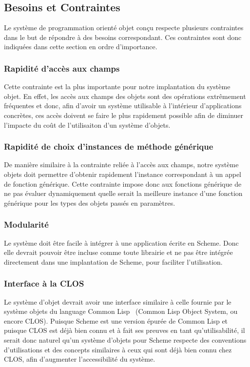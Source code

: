 \documentclass[letterpaper,12pt]{article}
\begin{document}
\clearpage



  \subsection{Besoins et Contraintes}
    Le système de programmation orienté objet conçu respecte plusieurs
    contraintes dans le but de répondre à des besoins
    correspondant. Ces contraintes sont donc indiquées dans cette
    section en ordre d'importance.

    \subsubsection{Rapidité d'accès aux champs}
      Cette contrainte est la plus importante pour notre implantation
      du système objet. En effet, les accès aux champs des objets sont
      des opérations extrêmement fréquentes et donc, afin d'avoir un
      système utilisable à l'intérieur d'applications concrètes, ces
      accès doivent se faire le plus rapidement possible afin de
      diminuer l'impacte du coût de l'utilisaiton d'un système
      d'objets.

    \subsubsection{Rapidité de choix d'instances de méthode générique}
      De manière similaire à la contrainte reliée à l'accès aux
      champs, notre système objets doit permettre d'obtenir rapidement
      l'instance correspondant à un appel de fonction générique. Cette
      contrainte impose donc aux fonctions générique de ne pas évaluer
      dynamiquement quelle serait la meilleure instance d'une fonction
      générique pour les types des objets passés en paramètres.

    \subsubsection{Modularité}
      Le système doit être facile à intégrer à une application écrite
      en Scheme. Donc elle devrait pouvoir être incluse comme toute
      librairie et ne pas être intégrée directement dans une
      implantation de Scheme, pour faciliter l'utilisation.

    \subsubsection{Interface à la CLOS}
      Le système d'objet devrait avoir une interface similaire à celle
      fournie par le système objets du language Common
      Lisp~\cite{COMMONLISP} (Common Lisp Object System, ou encore
      CLOS). Puisque Scheme est une version épurée de Common Lisp et
      puisque CLOS est déjà bien connu et à fait ses preuves en tant
      qu'utilisabilité, il serait donc naturel qu'un système d'objets
      pour Scheme respecte des conventions d'utilisations et des
      concepts similaires à ceux qui sont déjà bien connu chez CLOS,
      afin d'augmenter l'accessibilité du système.
    
\end{document}

